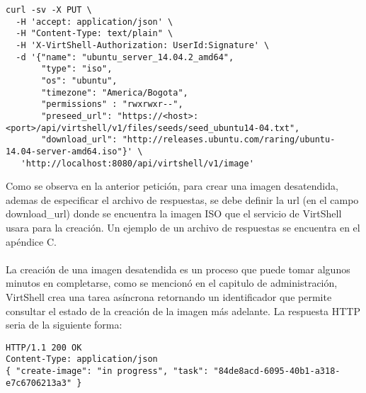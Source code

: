 \vspace{5mm}

\begin{lstlisting}[style=json, caption=Petición HTTP para crear una imagen desatendida]
curl -sv -X PUT \
  -H 'accept: application/json' \
  -H "Content-Type: text/plain" \
  -H 'X-VirtShell-Authorization: UserId:Signature' \
  -d '{"name": "ubuntu_server_14.04.2_amd64",
       "type": "iso",
       "os": "ubuntu", 
       "timezone": "America/Bogota", 
       "permissions" : "rwxrwxr--",
       "preseed_url": "https://<host>:<port>/api/virtshell/v1/files/seeds/seed_ubuntu14-04.txt",
       "download_url": "http://releases.ubuntu.com/raring/ubuntu-14.04-server-amd64.iso"}' \
   'http://localhost:8080/api/virtshell/v1/image'
\end{lstlisting}

\vspace{5mm}

Como se observa en la anterior petición, para crear una imagen desatendida, ademas de especificar el archivo de respuestas, se debe definir la url (en el campo download\_url) donde se encuentra la imagen ISO que el servicio de VirtShell usara para la creación. Un ejemplo de un archivo de respuestas se encuentra en el apéndice C.\\
\\
La creación de una imagen desatendida es un proceso que puede tomar algunos minutos en completarse, como se mencionó en el capitulo de administración, VirtShell crea una tarea asíncrona retornando un identificador que permite consultar el estado de la creación de la imagen más adelante. La respuesta HTTP seria de la siguiente forma:

\vspace{5mm}

\begin{lstlisting}[style=json, caption=Ejemplo de respuesta HTTP para la creación de una imagen]
HTTP/1.1 200 OK
Content-Type: application/json
{ "create-image": "in progress", "task": "84de8acd-6095-40b1-a318-e7c6706213a3" }
\end{lstlisting}

\vspace{5mm}

